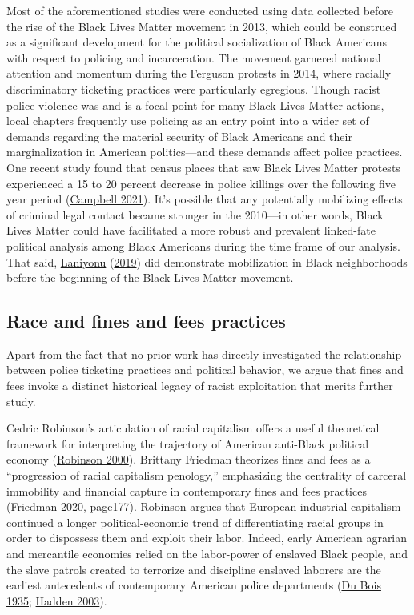 \documentclass[
  12pt,
]{article}
\begin{document}
Most of the aforementioned studies were conducted using data collected before the rise of the Black Lives Matter movement in 2013, which could be construed as a significant development for the political socialization of Black Americans with respect to policing and incarceration. The movement garnered national attention and momentum during the Ferguson protests in 2014, where racially discriminatory ticketing practices were particularly egregious. Though racist police violence was and is a focal point for many Black Lives Matter actions, local chapters frequently use policing as an entry point into a wider set of demands regarding the material security of Black Americans and their marginalization in American politics---and these demands affect police practices. One recent study found that census places that saw Black Lives Matter protests experienced a 15 to 20 percent decrease in police killings over the following five year period (\protect\hyperlink{ref-Campbell2021}{Campbell 2021}). It's possible that any potentially mobilizing effects of criminal legal contact became stronger in the 2010---in other words, Black Lives Matter could have facilitated a more robust and prevalent linked-fate political analysis among Black Americans during the time frame of our analysis. That said, \protect\hyperlink{ref-Laniyonu2019}{Laniyonu} (\protect\hyperlink{ref-Laniyonu2019}{2019}) did demonstrate mobilization in Black neighborhoods before the beginning of the Black Lives Matter movement.

\hypertarget{race-and-fines-and-fees-practices}{%
\subsection*{Race and fines and fees practices}\label{race-and-fines-and-fees-practices}}

Apart from the fact that no prior work has directly investigated the relationship between police ticketing practices and political behavior, we argue that fines and fees invoke a distinct historical legacy of racist exploitation that merits further study.

Cedric Robinson's articulation of racial capitalism offers a useful theoretical framework for interpreting the trajectory of American anti-Black political economy (\protect\hyperlink{ref-Robinson2000}{Robinson 2000}). Brittany Friedman theorizes fines and fees as a ``progression of racial capitalism penology,'' emphasizing the centrality of carceral immobility and financial capture in contemporary fines and fees practices (\protect\hyperlink{ref-Friedman2020}{Friedman 2020, page177}). Robinson argues that European industrial capitalism continued a longer political-economic trend of differentiating racial groups in order to dispossess them and exploit their labor. Indeed, early American agrarian and mercantile economies relied on the labor-power of enslaved Black people, and the slave patrols created to terrorize and discipline enslaved laborers are the earliest antecedents of contemporary American police departments (\protect\hyperlink{ref-DuBois1935}{Du Bois 1935}; \protect\hyperlink{ref-Hadden2003}{Hadden 2003}).
\end{document}
